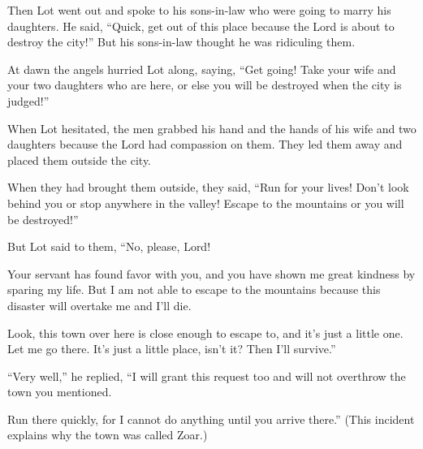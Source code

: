 \begin{scripture}
 Then Lot went out and spoke to his sons-in-law who were going to marry his daughters. He said, ``Quick, get out of this place because the Lord is about to destroy the city!'' But his sons-in-law thought he was ridiculing them.
\everypar{}

 At dawn the angels hurried Lot along, saying, ``Get going! Take your wife and your two daughters who are here, or else you will be destroyed when the city is judged!''
 When Lot hesitated, the men grabbed his hand and the hands of his wife and two daughters because the Lord had compassion on them. They led them away and placed them outside the city.
 When they had brought them outside, they said, ``Run for your lives! Don't look behind you or stop anywhere in the valley! Escape to the mountains or you will be destroyed!''
\everypar{}

 But Lot said to them, ``No, please, Lord!
 Your servant has found favor with you, and you have shown me great kindness by sparing my life. But I am not able to escape to the mountains because this disaster will overtake me and I'll die.
 Look, this town over here is close enough to escape to, and it's just a little one. Let me go there. It's just a little place, isn't it? Then I'll survive.''
\everypar{}

 ``Very well,'' he replied, ``I will grant this request too and will not overthrow the town you mentioned.
 Run there quickly, for I cannot do anything until you arrive there.'' (This incident explains why the town was called Zoar.)
\everypar{}


\end{scripture}
